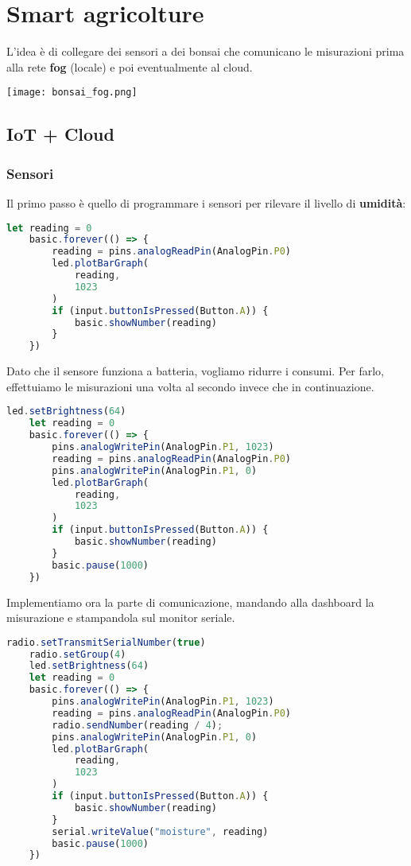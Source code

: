 \newpage
\section{Smart agricolture}
L'idea è di collegare dei sensori a dei bonsai che comunicano le misurazioni prima alla rete \textbf{fog} (locale) e poi eventualmente al cloud.
\begin{center}
	\texttt{[image: bonsai\_fog.png]}
\end{center}
\subsection{IoT + Cloud}
\subsubsection{Sensori}
Il primo passo è quello di programmare i sensori per rilevare il livello di \textbf{umidità}:
\begin{lstlisting}[language=JavaScript]
	let reading = 0
	basic.forever(() => {
		reading = pins.analogReadPin(AnalogPin.P0)
		led.plotBarGraph(
			reading,
			1023
		)
		if (input.buttonIsPressed(Button.A)) {
			basic.showNumber(reading)
		}
	})
\end{lstlisting}
Dato che il sensore funziona a batteria, vogliamo ridurre i consumi. Per farlo, effettuiamo le misurazioni una volta al secondo invece che in continuazione.
\begin{lstlisting}[language=JavaScript]
	led.setBrightness(64)
	let reading = 0
	basic.forever(() => {
		pins.analogWritePin(AnalogPin.P1, 1023)
		reading = pins.analogReadPin(AnalogPin.P0)
		pins.analogWritePin(AnalogPin.P1, 0)
		led.plotBarGraph(
			reading,
			1023
		)
		if (input.buttonIsPressed(Button.A)) {
			basic.showNumber(reading)
		}
		basic.pause(1000)
	})
\end{lstlisting}
\newpage
Implementiamo ora la parte di comunicazione, mandando alla dashboard la misurazione e stampandola sul monitor seriale.
\begin{lstlisting}[language=JavaScript]
	radio.setTransmitSerialNumber(true)
	radio.setGroup(4)
	led.setBrightness(64)
	let reading = 0
	basic.forever(() => {
		pins.analogWritePin(AnalogPin.P1, 1023)
		reading = pins.analogReadPin(AnalogPin.P0)
		radio.sendNumber(reading / 4);
		pins.analogWritePin(AnalogPin.P1, 0)
		led.plotBarGraph(
			reading,
			1023
		)
		if (input.buttonIsPressed(Button.A)) {
			basic.showNumber(reading)
		}
		serial.writeValue("moisture", reading)
		basic.pause(1000)
	})
\end{lstlisting}
